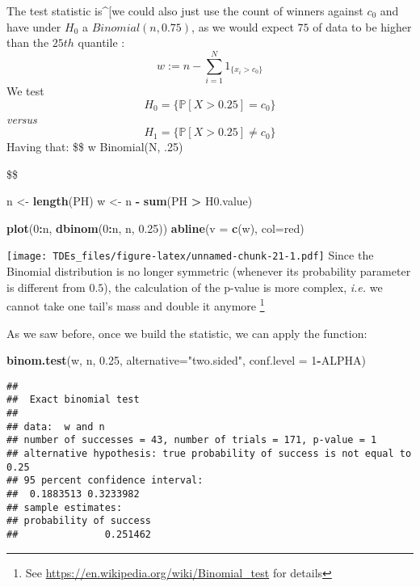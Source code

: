 \documentclass[
]{article}
\newenvironment{Shaded}{\begin{snugshade}}{\end{snugshade}}
\newcommand{\AttributeTok}[1]{\textcolor[rgb]{0.13,0.29,0.53}{#1}}
\newcommand{\DecValTok}[1]{\textcolor[rgb]{0.00,0.00,0.81}{#1}}
\newcommand{\FloatTok}[1]{\textcolor[rgb]{0.00,0.00,0.81}{#1}}
\newcommand{\FunctionTok}[1]{\textcolor[rgb]{0.13,0.29,0.53}{\textbf{#1}}}
\newcommand{\NormalTok}[1]{#1}
\newcommand{\OtherTok}[1]{\textcolor[rgb]{0.56,0.35,0.01}{#1}}
\newcommand{\SpecialCharTok}[1]{\textcolor[rgb]{0.81,0.36,0.00}{\textbf{#1}}}
\newcommand{\StringTok}[1]{\textcolor[rgb]{0.31,0.60,0.02}{#1}}
\begin{document}
The test statistic is\^{}{[}we could also just use the count of winners
against \(c_0\) and have under \(H_0\) a \(Binomial(n, 0.75)\), as we
would expect \(75%
\) of data to be higher than the \(25th\) quantile : \[
w := n-\sum_{i=1}^N \mathcal{1}_{\{ x_i > c_0\}}
\] We test \[
H_0 = \{\mathbb{P}[X > 0.25] = c_0 \}
\] \emph{versus} \[
H_1 = \{\mathbb{P}[X > 0.25] \neq c_0 \}
\] Having that: \$\$ w  Binomial(N, .25)

\$\$

\begin{Shaded}
\begin{Highlighting}[]
\NormalTok{n }\OtherTok{\textless{}{-}} \FunctionTok{length}\NormalTok{(PH) }
\NormalTok{w }\OtherTok{\textless{}{-}}\NormalTok{ n }\SpecialCharTok{{-}} \FunctionTok{sum}\NormalTok{(PH }\SpecialCharTok{\textgreater{}}\NormalTok{ H0.value)}

\FunctionTok{plot}\NormalTok{(}\DecValTok{0}\SpecialCharTok{:}\NormalTok{n, }\FunctionTok{dbinom}\NormalTok{(}\DecValTok{0}\SpecialCharTok{:}\NormalTok{n, n, }\FloatTok{0.25}\NormalTok{))}
\FunctionTok{abline}\NormalTok{(}\AttributeTok{v =} \FunctionTok{c}\NormalTok{(w), }\AttributeTok{col=}\StringTok{\textquotesingle{}red\textquotesingle{}}\NormalTok{)}
\end{Highlighting}
\end{Shaded}

\texttt{[image: TDEs\_files/figure-latex/unnamed-chunk-21-1.pdf]} Since
the Binomial distribution is no longer symmetric (whenever its
probability parameter is different from \(0.5\)), the calculation of the
p-value is more complex, \emph{i.e.} we cannot take one tail's mass and
double it anymore \footnote{See
  \url{https://en.wikipedia.org/wiki/Binomial_test} for details}

As we saw before, once we build the statistic, we can apply the
function:

\begin{Shaded}
\begin{Highlighting}[]
\FunctionTok{binom.test}\NormalTok{(w, n, }\FloatTok{0.25}\NormalTok{, }\AttributeTok{alternative=}\StringTok{"two.sided"}\NormalTok{, }\AttributeTok{conf.level =} \DecValTok{1}\SpecialCharTok{{-}}\NormalTok{ALPHA)}
\end{Highlighting}
\end{Shaded}

\begin{verbatim}
## 
##  Exact binomial test
## 
## data:  w and n
## number of successes = 43, number of trials = 171, p-value = 1
## alternative hypothesis: true probability of success is not equal to 0.25
## 95 percent confidence interval:
##  0.1883513 0.3233982
## sample estimates:
## probability of success 
##               0.251462
\end{verbatim}
\end{document}
